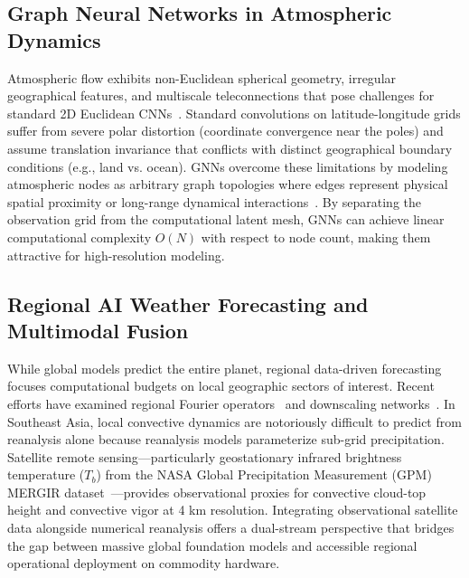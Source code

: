 \subsection{Graph Neural Networks in Atmospheric Dynamics}
Atmospheric flow exhibits non-Euclidean spherical geometry, irregular geographical features, and multiscale teleconnections that pose challenges for standard 2D Euclidean CNNs~\cite{bronstein2017geometric}. Standard convolutions on latitude-longitude grids suffer from severe polar distortion (coordinate convergence near the poles) and assume translation invariance that conflicts with distinct geographical boundary conditions (e.g., land vs. ocean). GNNs overcome these limitations by modeling atmospheric nodes as arbitrary graph topologies where edges represent physical spatial proximity or long-range dynamical interactions~\cite{battaglia2018relational, keisler2022forecasting}. By separating the observation grid from the computational latent mesh, GNNs can achieve linear computational complexity $O(N)$ with respect to node count, making them attractive for high-resolution modeling.

\subsection{Regional AI Weather Forecasting and Multimodal Fusion}
While global models predict the entire planet, regional data-driven forecasting focuses computational budgets on local geographic sectors of interest. Recent efforts have examined regional Fourier operators~\cite{bonev2023spherical} and downscaling networks~\cite{vandal2017deepsd}. In Southeast Asia, local convective dynamics are notoriously difficult to predict from reanalysis alone because reanalysis models parameterize sub-grid precipitation. Satellite remote sensing—particularly geostationary infrared brightness temperature ($T_b$) from the NASA Global Precipitation Measurement (GPM) MERGIR dataset~\cite{janowiak2001mergir}—provides observational proxies for convective cloud-top height and convective vigor at 4 km resolution. Integrating observational satellite data alongside numerical reanalysis offers a dual-stream perspective that bridges the gap between massive global foundation models and accessible regional operational deployment on commodity hardware.

